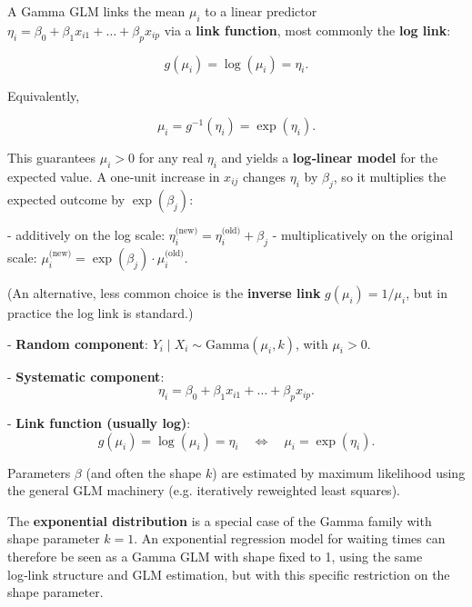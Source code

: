 A Gamma GLM links the mean $\mu_i$ to a linear predictor $\eta_i = \beta_0 + \beta_1 x_{i1} + \dots + \beta_p x_{ip}$ via a \textbf{link function}, most commonly the \textbf{log link}:

\[
g(\mu_i) = \log(\mu_i) = \eta_i.
\]

Equivalently,

\[
\mu_i = g^{-1}(\eta_i) = \exp(\eta_i).
\]

This guarantees $\mu_i > 0$ for any real $\eta_i$ and yields a \textbf{log‑linear model} for the expected value. A one‑unit increase in $x_{ij}$ changes $\eta_i$ by $\beta_j$, so it multiplies the expected outcome by $\exp(\beta_j)$:

- additively on the log scale: $\eta_i^\text{(new)} = \eta_i^\text{(old)} + \beta_j$ 
- multiplicatively on the original scale: $\mu_i^\text{(new)} = \exp(\beta_j) \cdot \mu_i^\text{(old)}$.

(An alternative, less common choice is the \textbf{inverse link} $g(\mu_i) = 1/\mu_i$, but in practice the log link is standard.)



- \textbf{Random component}:  
  $Y_i \mid X_i \sim \text{Gamma}(\mu_i, k)$, with $\mu_i > 0$.

- \textbf{Systematic component}:  
  \[
  \eta_i = \beta_0 + \beta_1 x_{i1} + \dots + \beta_p x_{ip}.
  \]

- \textbf{Link function (usually log)}:  
  \[
  g(\mu_i) = \log(\mu_i) = \eta_i \quad \Longleftrightarrow \quad \mu_i = \exp(\eta_i).
  \]

Parameters $\beta$ (and often the shape $k$) are estimated by maximum likelihood using the general GLM machinery (e.g. iteratively reweighted least squares).



The \textbf{exponential distribution} is a special case of the Gamma family with shape parameter $k = 1$. An exponential regression model for waiting times can therefore be seen as a Gamma GLM with shape fixed to 1, using the same log‑link structure and GLM estimation, but with this specific restriction on the shape parameter.
